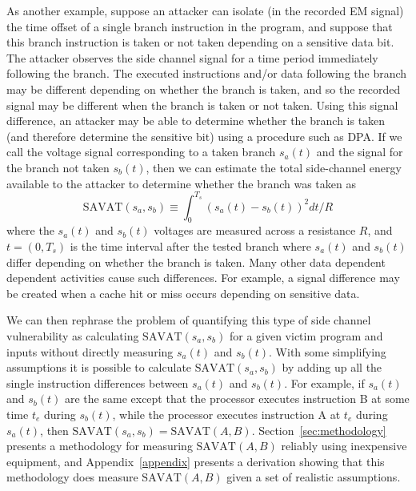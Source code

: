 As another example, suppose an attacker can isolate (in the recorded EM signal) the time offset of a single branch instruction in the program, and suppose that this branch instruction is taken or not taken depending on a sensitive data bit. The attacker observes the side channel signal for a time period immediately following the branch. The executed instructions and/or data following the branch may be different depending on whether the branch is taken, and so the recorded signal may be different when the branch is taken or not taken. Using this signal difference, an attacker may be able to determine whether the branch is taken (and therefore determine the sensitive bit) using a procedure such as DPA. If we call the voltage signal corresponding to a taken branch $s_a(t)$ and the signal for the branch not taken $s_b(t)$, then we can estimate the total side-channel energy available to the attacker to determine whether the branch was taken as
\begin{equation}
  \textrm{SAVAT}(s_a,s_b) \equiv \int_{0}^{T_s} (s_a(t) - s_b(t))^2 dt/R
\end{equation}
where the $s_a(t)$ and $s_b(t)$ voltages are measured across a resistance $R$, and $t = (0,T_s)$ is the time interval after the tested branch where $s_a(t)$ and $s_b(t)$ differ depending on whether the branch is taken. Many other data dependent dependent activities cause such differences. For example, a signal difference may be created when a cache hit or miss occurs depending on sensitive data.

We can then rephrase the problem of quantifying this type of side channel vulnerability as calculating $\textrm{SAVAT}(s_a,s_b)$ for a given victim program and inputs without directly measuring $s_a(t)$ and $s_b(t)$. With some simplifying assumptions it is possible to calculate $\textrm{SAVAT}(s_a,s_b)$ by adding up all the single instruction differences between $s_a(t)$ and $s_b(t)$. For example, if $s_a(t)$ and $s_b(t)$ are the same except that the processor executes instruction B at some time $t_e$ during $s_b(t)$, while the processor executes instruction A at $t_e$ during $s_a(t)$, then $\textrm{SAVAT}(s_a,s_b) = \textrm{SAVAT}(A,B)$. Section~\ref{sec:methodology} presents a methodology for measuring $\textrm{SAVAT}(A,B)$ reliably using inexpensive equipment, and Appendix~\ref{appendix} presents a derivation showing that this methodology does measure $\textrm{SAVAT}(A,B)$ given a set of realistic assumptions. 

